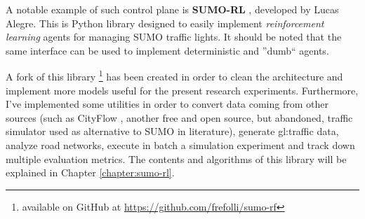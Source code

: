 A notable example of such control plane is \textbf{SUMO-RL} \cite{sumorl}, developed by Lucas Alegre. This is Python library designed to easily implement \textit{reinforcement learning} agents for managing SUMO traffic lights. It should be noted that the same interface can be used to implement deterministic and ''dumb`` agents.

A fork of this library \footnote{available on GitHub at \href{https://github.com/frefolli/sumo-rf}{https://github.com/frefolli/sumo-rf}} has been created in order to clean the architecture and implement more models useful for the present research experiments. Furthermore, I've implemented some utilities in order to convert data coming from other sources (such as CityFlow \cite{10.1145/3308558.3314139}, another free and open source, but abandoned, traffic simulator used as alternative to SUMO in literature), generate \gls{gl:traffic} data, analyze road networks, execute in batch a simulation experiment and track down multiple evaluation metrics. The contents and algorithms of this library will be explained in Chapter \ref{chapter:sumo-rl}.

